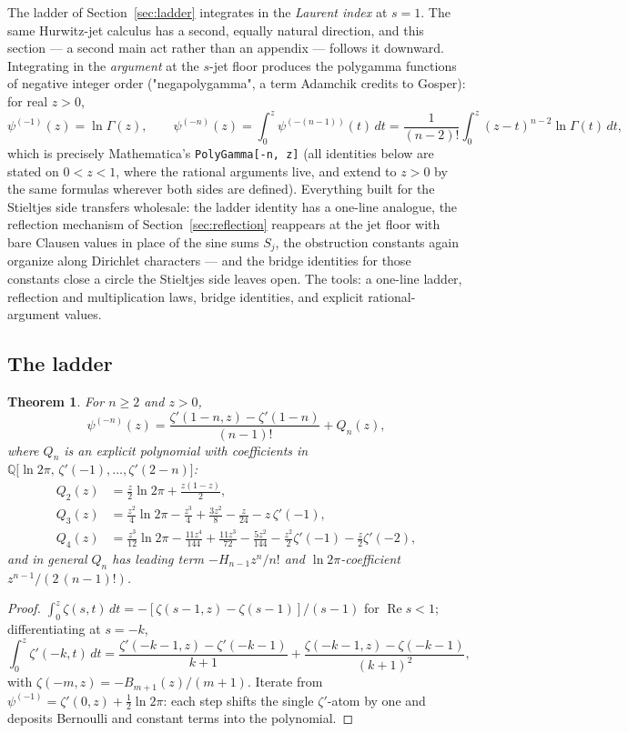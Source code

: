 \documentclass[11pt]{article}
\newtheorem{theorem}{Theorem}[section]
\theoremstyle{remark}
\begin{document}
The ladder of Section~\ref{sec:ladder} integrates in the \emph{Laurent
index} at $s=1$. The same Hurwitz-jet calculus has a second, equally
natural direction, and this section — a second main act rather than an
appendix — follows it downward. Integrating in the \emph{argument} at the
$s$-jet floor produces the polygamma functions of negative integer order
("negapolygamma", a term Adamchik \cite{Adamchik98} credits to Gosper):
for real $z>0$,
\[
\psi^{(-1)}(z)=\ln\Gamma(z),\qquad
\psi^{(-n)}(z)=\int_0^z\psi^{(-(n-1))}(t)\,dt
=\frac{1}{(n-2)!}\int_0^z(z-t)^{n-2}\ln\Gamma(t)\,dt ,
\]
which is precisely Mathematica's \texttt{PolyGamma[-n,\,z]} (all
identities below are stated on $0<z<1$, where the rational arguments
live, and extend to $z>0$ by the same formulas wherever both sides are
defined). Everything built for the Stieltjes side transfers wholesale:
the ladder identity has a one-line analogue, the reflection mechanism of
Section~\ref{sec:reflection} reappears at the jet floor with bare Clausen
values in place of the sine sums $S_j$, the obstruction constants again
organize along Dirichlet characters — and the bridge identities for those
constants close a circle the Stieltjes side leaves open. The tools:
a one-line ladder, reflection and multiplication laws, bridge identities,
and explicit rational-argument values.

\subsection{The ladder}

\begin{theorem}\label{thm:negladder}
For $n\ge2$ and $z>0$,
\[
\psi^{(-n)}(z)=\frac{\zeta'(1-n,z)-\zeta'(1-n)}{(n-1)!}+Q_n(z),
\]
where $Q_n$ is an explicit polynomial with coefficients in
$\mathbb{Q}\bigl[\ln 2\pi,\,\zeta'(-1),\dots,\zeta'(2-n)\bigr]$:
\begin{align*}
Q_2(z)&=\tfrac{z}{2}\ln2\pi+\tfrac{z(1-z)}{2},\\
Q_3(z)&=\tfrac{z^2}{4}\ln2\pi-\tfrac{z^3}{4}+\tfrac{3z^2}{8}-\tfrac{z}{24}
-z\,\zeta'(-1),\\
Q_4(z)&=\tfrac{z^3}{12}\ln2\pi-\tfrac{11z^4}{144}+\tfrac{11z^3}{72}
-\tfrac{5z^2}{144}-\tfrac{z^2}{2}\zeta'(-1)-\tfrac{z}{2}\zeta'(-2),
\end{align*}
and in general $Q_n$ has leading term $-H_{n-1}z^n/n!$ and
$\ln2\pi$-coefficient $z^{n-1}/(2\,(n-1)!)$.
\end{theorem}

\begin{proof}
$\int_0^z\zeta(s,t)\,dt=-[\zeta(s-1,z)-\zeta(s-1)]/(s-1)$ for
$\operatorname{Re}s<1$; differentiating at $s=-k$,
\[
\int_0^z\zeta'(-k,t)\,dt
=\frac{\zeta'(-k-1,z)-\zeta'(-k-1)}{k+1}
+\frac{\zeta(-k-1,z)-\zeta(-k-1)}{(k+1)^2},
\]
with $\zeta(-m,z)=-B_{m+1}(z)/(m+1)$. Iterate from
$\psi^{(-1)}=\zeta'(0,z)+\tfrac12\ln2\pi$: each step shifts the single
$\zeta'$-atom by one and deposits Bernoulli and constant terms into the
polynomial.
\end{proof}
\end{document}
